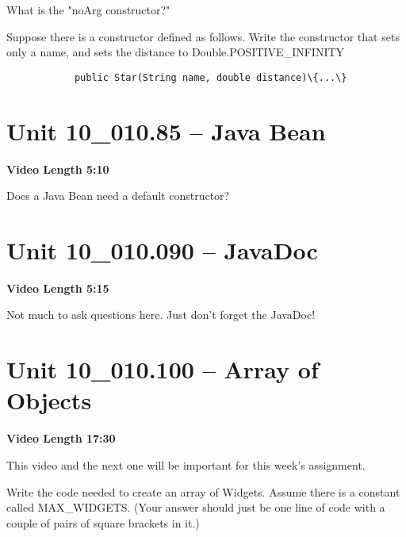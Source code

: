 \documentclass[letterpaper,12pt]{exam}
\newcommand{\unit}{Unit 10}
\begin{document}
\begin{questions}
\begin{samepage}
    \question What is the "noArg constructor?"
    \vspace{5mm}
\end{samepage}

\begin{samepage}
    \question Suppose there is a constructor defined as follows.  Write the constructor that sets only a name, and sets the distance to Double.POSITIVE\_INFINITY
    \begin{verbatim}
            public Star(String name, double distance)\{...\}
    \end{verbatim}
    \vspace{5mm}
\end{samepage}


\section*{\unit\_010.85 -- Java Bean} 
\par{\selectfont\textbf{Video Length 5:10}}
\begin{samepage}
    \question Does a Java Bean need a default constructor?  
    \vspace{5mm}
\end{samepage}

\section*{\unit\_010.090 -- JavaDoc} 
\par{\selectfont\textbf{Video Length 5:15}}

Not much to ask questions here.  Just don't forget the JavaDoc!

\section*{\unit\_010.100 -- Array of Objects } 
\par{\selectfont\textbf{Video Length 17:30}}

This video and the next one will be important for this week's assignment.

\begin{samepage}
    \question Write the code needed to create an array of Widgets.  Assume there is a constant called MAX\_WIDGETS. (Your answer should just be one line of code with a couple of pairs of square brackets in it.)
    \vspace{5mm}
\end{samepage}


\end{questions}
\end{document}

